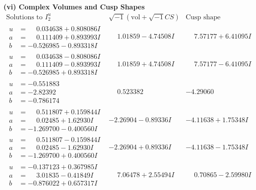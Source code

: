 \documentclass[1p]{elsarticle_modified}
\theoremstyle{definition}
\newcommand{\I}{\sqrt{-1}}
\begin{document}
\newpage\flushleft \textbf{(vi) Complex Volumes and Cusp Shapes}
$$\begin{array}{c|c|c}  
\text{Solutions to }I^u_{2}& \I (\text{vol} + \sqrt{-1}CS) & \text{Cusp shape}\\
 \hline 
\begin{aligned}
u &= \phantom{-}0.034638 + 0.808086 I \\
a &= \phantom{-}0.111409 + 0.893993 I \\
b &= -0.526985 - 0.893318 I\end{aligned}
 & \phantom{-}1.01859 - 4.74508 I & \phantom{-}7.57177 + 6.41095 I \\ \hline\begin{aligned}
u &= \phantom{-}0.034638 - 0.808086 I \\
a &= \phantom{-}0.111409 - 0.893993 I \\
b &= -0.526985 + 0.893318 I\end{aligned}
 & \phantom{-}1.01859 + 4.74508 I & \phantom{-}7.57177 - 6.41095 I \\ \hline\begin{aligned}
u &= -0.551883\phantom{ +0.000000I} \\
a &= -2.82392\phantom{ +0.000000I} \\
b &= -0.786174\phantom{ +0.000000I}\end{aligned}
 & \phantom{-}0.523382\phantom{ +0.000000I} & -4.29060\phantom{ +0.000000I} \\ \hline\begin{aligned}
u &= \phantom{-}0.511807 + 0.159844 I \\
a &= \phantom{-}0.02485 + 1.62930 I \\
b &= -1.269700 - 0.400560 I\end{aligned}
 & -2.26904 - 0.89336 I & -4.11638 + 1.75348 I \\ \hline\begin{aligned}
u &= \phantom{-}0.511807 - 0.159844 I \\
a &= \phantom{-}0.02485 - 1.62930 I \\
b &= -1.269700 + 0.400560 I\end{aligned}
 & -2.26904 + 0.89336 I & -4.11638 - 1.75348 I \\ \hline\begin{aligned}
u &= -0.137123 + 0.367985 I \\
a &= \phantom{-}3.01835 - 0.41849 I \\
b &= -0.876022 + 0.657317 I\end{aligned}
 & \phantom{-}7.06478 + 2.55494 I & \phantom{-}0.70865 - 2.59980 I \\ \hline\begin{aligned}

\end{aligned}
\end{array}$$
\end{document}
